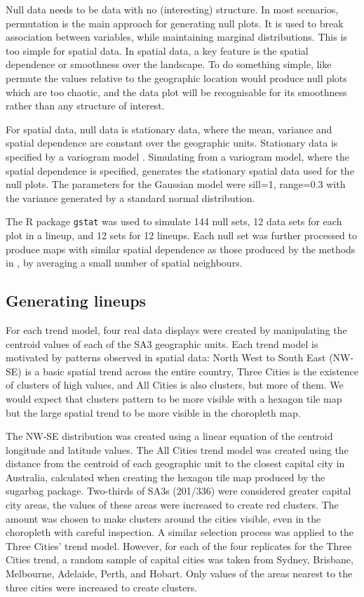 \documentclass[
doublespace,
  times]{anzsauth}
\begin{document}
Null data needs to be data with no (interesting) structure. In most
scenarios, permutation is the main approach for generating null plots.
It is used to break association between variables, while maintaining
marginal distributions. This is too simple for spatial data. In spatial
data, a key feature is the spatial dependence or smoothness over the
landscape. To do something simple, like permute the values relative to
the geographic location would produce null plots which are too chaotic,
and the data plot will be recognisable for its smoothness rather than
any structure of interest.

For spatial data, null data is stationary data, where the mean, variance
and spatial dependence are constant over the geographic units.
Stationary data is specified by a variogram model \citep{POG}.
Simulating from a variogram model, where the spatial dependence is
specified, generates the stationary spatial data used for the null
plots. The parameters for the Gaussian model were sill=1, range=0.3 with
the variance generated by a standard normal distribution.

The R package \texttt{gstat} \citep{gstat} was used to simulate 144 null
sets, 12 data sets for each plot in a lineup, and 12 sets for 12
lineups. Each null set was further processed to produce maps with
similar spatial dependence as those produced by the methods in
\citet{atlas-methods}, by averaging a small number of spatial
neighbours.

\subsection{Generating lineups}\label{generating-lineups}

For each trend model, four real data displays were created by
manipulating the centroid values of each of the SA3 geographic units.
Each trend model is motivated by patterns observed in spatial data:
North West to South East (NW-SE) is a basic spatial trend across the
entire country, Three Cities is the existence of clusters of high
values, and All Cities is also clusters, but more of them. We would
expect that clusters pattern to be more visible with a hexagon tile map
but the large spatial trend to be more visible in the choropleth map.

The NW-SE distribution was created using a linear equation of the
centroid longitude and latitude values. The All Cities trend model was
created using the distance from the centroid of each geographic unit to
the closest capital city in Australia, calculated when creating the
hexagon tile map produced by the sugarbag \citep{sugarbag} package.
Two-thirds of SA3s (201/336) were considered greater capital city areas,
the values of these areas were increased to create red clusters. The
amount was chosen to make clusters around the cities visible, even in
the choropleth with careful inspection. A similar selection process was
applied to the Three Cities' trend model. However, for each of the four
replicates for the Three Cities trend, a random sample of capital cities
was taken from Sydney, Brisbane, Melbourne, Adelaide, Perth, and Hobart.
Only values of the areas nearest to the three cities were increased to
create clusters.
\end{document}
